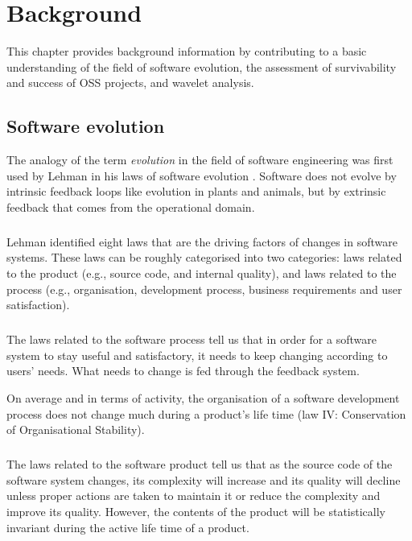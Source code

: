 \chapter{Background}
\label{background}

This chapter provides background information by contributing to a basic
understanding of the field of software evolution, the assessment of
survivability and success of OSS projects, and wavelet analysis.

\section{Software evolution}
The analogy of the term \emph{evolution }\rm in the field of software
engineering was first used by Lehman in his laws of software evolution
\cite{lehman}. Software does not evolve by intrinsic feedback loops like
evolution in plants and animals, but by extrinsic feedback that comes from the
operational domain.

\paragraph{}
Lehman identified eight laws that are the driving factors of changes in software
systems. These laws can be roughly categorised into two categories: laws
related to the product (e.g., source code, and internal quality), and laws
related to the process (e.g., organisation, development process, business
requirements and user satisfaction).

\paragraph{}
The laws related to the software process tell us that in order for a software
system to stay useful and satisfactory, it needs to keep changing according to
users' needs. What needs to change is fed through the feedback system.

On average and in terms of activity, the organisation of a software development
process does not change much during a product's life time (law IV:
Conservation of Organisational Stability).

\paragraph{}
The laws related to the software product tell us that as the source code of the
software system changes, its complexity will increase and its quality will
decline unless proper actions are taken to maintain it or reduce the complexity
and improve its quality. However, the contents of the product will be
statistically invariant during the active life time of a product.

